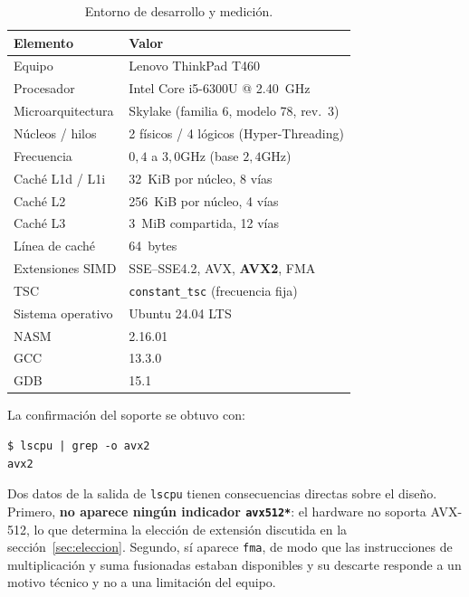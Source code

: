 \documentclass[journal]{IEEEtran}
\begin{document}
\begin{table}[h]
\centering
\caption{Entorno de desarrollo y medición.}
\label{tab:entorno}
\footnotesize
\setlength{\tabcolsep}{4pt}
\begin{tabular}{|l|l|}
\hline
\textbf{Elemento} & \textbf{Valor} \\ \hline
Equipo             & Lenovo ThinkPad T460 \\ \hline
Procesador         & Intel Core i5-6300U @ \SI{2,40}{GHz} \\ \hline
Microarquitectura  & Skylake (familia 6, modelo 78, rev.\ 3) \\ \hline
Núcleos / hilos  & 2 físicos / 4 lógicos (Hyper-Threading) \\ \hline
Frecuencia         & $0,4$ a $3,0$GHz (base $2,4$GHz) \\ \hline
Caché L1d / L1i  & \SI{32}{KiB} por núcleo, 8 vías \\ \hline
Caché L2         & \SI{256}{KiB} por núcleo, 4 vías \\ \hline
Caché L3         & \SI{3}{MiB} compartida, 12 vías \\ \hline
Línea de caché & \SI{64}{bytes} \\ \hline
Extensiones SIMD   & SSE--SSE4.2, AVX, \textbf{AVX2}, FMA \\ \hline
TSC                & \texttt{constant\_tsc} (frecuencia fija) \\ \hline
Sistema operativo  & Ubuntu 24.04 LTS \\ \hline
NASM               & 2.16.01 \\ \hline
GCC                & 13.3.0 \\ \hline
GDB                & 15.1 \\ \hline
\end{tabular}
\end{table}

La confirmación del soporte se obtuvo con:

\begin{lstlisting}[style=shell,caption={Verificación del soporte de AVX2.}]
$ lscpu | grep -o avx2
avx2
\end{lstlisting}

Dos datos de la salida de \texttt{lscpu} tienen consecuencias directas
sobre el diseño. Primero, \textbf{no aparece ningún indicador
\texttt{avx512*}}: el hardware no soporta AVX-512, lo que determina la
elección de extensión discutida en la sección~\ref{sec:eleccion}.
Segundo, sí aparece \texttt{fma}, de modo que las instrucciones de
multiplicación y suma fusionadas estaban disponibles y su descarte
responde a un motivo técnico y no a una limitación del equipo.
\end{document}
